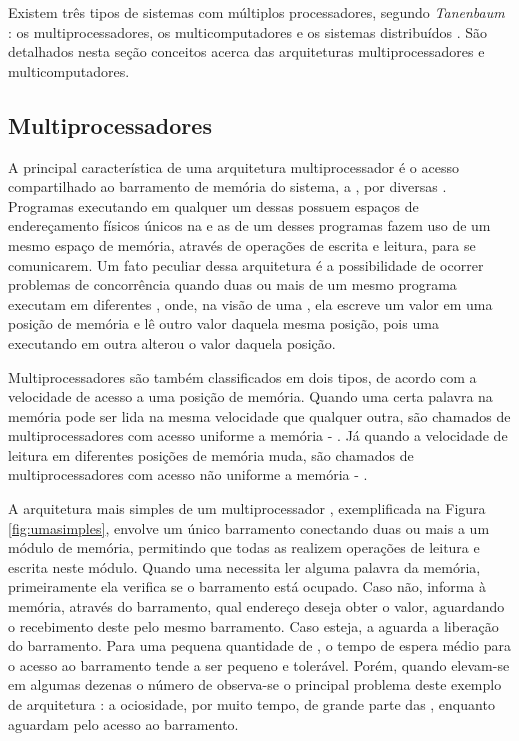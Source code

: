 Existem três tipos de sistemas com múltiplos processadores, segundo \textit{Tanenbaum} \etal : os multiprocessadores, os multicomputadores e os sistemas distribuídos \cite{TanenbaumMordenOS}. São detalhados nesta seção conceitos acerca das arquiteturas multiprocessadores e multicomputadores.

\subsection{Multiprocessadores}
\label{sec:multiprocessadores}

A principal característica de uma arquitetura multiprocessador é o acesso compartilhado ao barramento de memória do sistema, a \RAM, por diversas \CPUs. Programas executando em qualquer um dessas \CPUs possuem espaços de endereçamento físicos únicos na \RAM e as \threads de um desses programas fazem uso de um mesmo espaço de memória, através de operações de escrita e leitura, para se comunicarem. Um fato peculiar dessa arquitetura é a possibilidade de ocorrer problemas de concorrência quando duas ou mais \threads de um mesmo programa executam em diferentes \CPUs, onde, na visão de uma \CPU, ela escreve um valor em uma posição de memória e lê outro valor daquela mesma posição, pois uma \thread executando em outra \CPU alterou o valor daquela posição. 

Multiprocessadores são também classificados em dois tipos, de acordo com a velocidade de acesso a uma posição de memória. Quando uma certa palavra na memória pode ser lida na mesma velocidade que qualquer outra, são chamados de multiprocessadores com acesso uniforme a memória - \UMA. Já quando a velocidade de leitura em diferentes posições de memória muda, são chamados de multiprocessadores com acesso não uniforme a memória - \NUMA. 

A arquitetura mais simples de um multiprocessador \UMA, exemplificada na Figura \ref{fig:umasimples}, envolve um único barramento conectando duas ou mais \CPUs a um módulo de memória, permitindo que todas as \CPUs realizem operações de leitura e escrita neste módulo. Quando uma \CPU necessita ler alguma palavra da memória, primeiramente ela verifica se o barramento está ocupado. Caso não, informa à memória, através do barramento, qual endereço deseja obter o valor, aguardando o recebimento deste pelo mesmo barramento. Caso esteja, a \CPU aguarda a liberação do barramento. Para uma pequena quantidade de \CPUs, o tempo de espera médio para o acesso ao barramento tende a ser pequeno e tolerável. Porém, quando elevam-se em algumas dezenas o número de \CPUs observa-se o principal problema deste exemplo de arquitetura \UMA: a ociosidade, por muito tempo, de grande parte das \CPUs, enquanto aguardam pelo acesso ao barramento.



